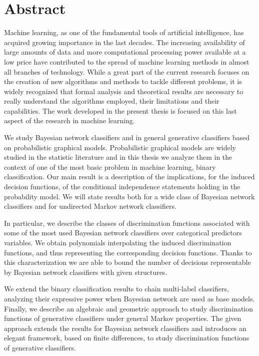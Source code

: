 \documentclass[11pt,a4paper, twoside]{book}
\begin{document}
\cleardoublepage

\section*{Abstract}

Machine learning, as one of the fundamental tools of artificial intelligence, has acquired growing importance in the last decades. The increasing availability of large amounts of data and more computational processing power available at a low price have contributed to the spread of machine learning methods in almost all branches of technology. 
While a great part of the current research focuses on the creation of new algorithms and methods to tackle different problems, it is widely recognized that formal analysis and theoretical results are necessary to really understand the algorithms employed, their limitations and their capabilities. 
The work developed in the present thesis is focused on this last aspect of the research in machine learning. 

We study Bayesian network classifiers and in general generative classifiers based on probabilistic graphical models. Probabilistic graphical models are widely studied in the statistic literature and in this thesis we analyze them in the context of one of the most basic problem in machine learning, binary classification. 
Our main result is a description of the implications, for the induced decision functions, of the conditional independence  statements holding in the probability model. We will state results both for a wide class of Bayesian network classifiers and for undirected Markov network classifiers. 

In particular, we describe the classes of discrimination functions associated with some of the most used Bayesian network classifiers over categorical predictors variables. We obtain polynomials interpolating the induced discrimination functions, and thus representing the corresponding decision functions. Thanks to this characterization we are able to bound the number of decisions representable by Bayesian network classifiers with given structures.

We extend the binary classification results to chain multi-label classifiers, analyzing their expressive power when Bayesian network are used as base models. 
Finally, we describe an algebraic and geometric approach to study discrimination functions of generative classifiers under general Markov properties. The given approach extends the results for Bayesian network classifiers and introduces an elegant framework, based on finite differences, to study discrimination functions of generative classifiers.
\end{document}
